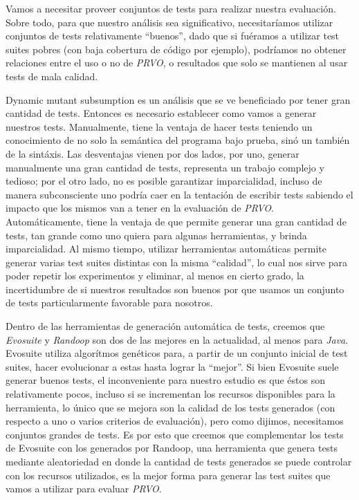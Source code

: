 Vamos a necesitar proveer conjuntos de tests para realizar nuestra evaluaci\'on. Sobre todo, para que nuestro an\'alisis sea significativo, necesitar\'iamos utilizar conjuntos de tests relativamente ``buenos'', dado que si fu\'eramos a utilizar test suites pobres (con baja cobertura de c\'odigo por ejemplo), podr\'iamos no obtener relaciones entre el uso o no de \emph{PRVO}, o resultados que solo se mantienen al usar tests de mala calidad.

Dynamic mutant subsumption es un an\'alisis que se ve beneficiado por tener gran cantidad de tests. Entonces es necesario establecer como vamos a generar nuestros tests. Manualmente, tiene la ventaja de hacer tests teniendo un conocimiento de no solo la sem\'antica del programa bajo prueba, sin\'o un tambi\'en de la sint\'axis. Las desventajas vienen por dos lados, por uno, generar manualmente una gran cantidad de tests, representa un trabajo complejo y tedioso; por el otro lado, no es posible garantizar imparcialidad, incluso de manera subconsciente uno podr\'ia caer en la tentaci\'on de escribir tests sabiendo el impacto que los mismos van a tener en la evaluaci\'on de \emph{PRVO}. Autom\'aticamente, tiene la ventaja de que permite generar una gran cantidad de tests, tan grande como uno quiera para algunas herramientas, y brinda imparcialidad. Al mismo tiempo, utilizar herramientas autom\'aticas permite generar varias test suites distintas con la misma ``calidad'', lo cual nos sirve para poder repetir los experimentos y eliminar, al menos en cierto grado, la incertidumbre de si nuestros resultados son buenos por que usamos un conjunto de tests particularmente favorable para nosotros. 

Dentro de las herramientas de generaci\'on autom\'atica de tests, creemos que \emph{Evosuite} y \emph{Randoop} son dos de las mejores en la actualidad, al menos para \emph{Java}. Evosuite utiliza algor\'itmos gen\'eticos para, a partir de un conjunto inicial de test suites, hacer evolucionar a estas hasta lograr la ``mejor''. Si bien Evosuite suele generar buenos tests, el inconveniente para nuestro estudio es que \'estos son relativamente pocos, incluso si se incrementan los recursos disponibles para la herramienta, lo \'unico que se mejora son la calidad de los tests generados (con respecto a uno o varios criterios de evaluaci\'on), pero como dijimos, necesitamos conjuntos grandes de tests. Es por esto que creemos que complementar los tests de Evosuite con los generados por Randoop, una herramienta que genera tests mediante aleatoriedad en donde la cantidad de tests generados se puede controlar con los recursos utilizados, es la mejor forma para generar las test suites que vamos a utilizar para evaluar \emph{PRVO}.

